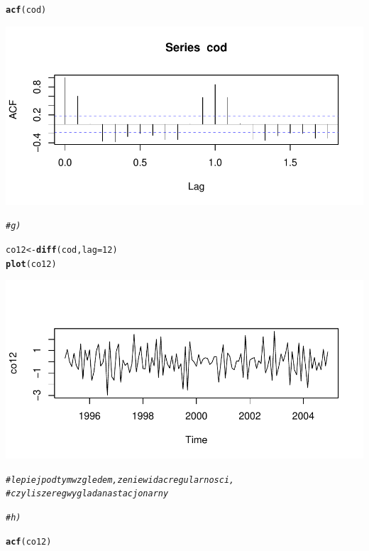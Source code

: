 \documentclass[10pt,a4paper,noindentfirst]{article}\usepackage[]{graphicx}\usepackage[]{color}
\makeatletter
\def\maxwidth{ %
  \ifdim\Gin@nat@width>\linewidth
    \linewidth
  \else
    \Gin@nat@width
  \fi
}
\newcommand{\hlnum}[1]{\textcolor[rgb]{0.686,0.059,0.569}{#1}}%
\newcommand{\hlcom}[1]{\textcolor[rgb]{0.678,0.584,0.686}{\textit{#1}}}%
\newcommand{\hlstd}[1]{\textcolor[rgb]{0.345,0.345,0.345}{#1}}%
\newcommand{\hlkwb}[1]{\textcolor[rgb]{0.69,0.353,0.396}{#1}}%
\newcommand{\hlkwc}[1]{\textcolor[rgb]{0.333,0.667,0.333}{#1}}%
\newcommand{\hlkwd}[1]{\textcolor[rgb]{0.737,0.353,0.396}{\textbf{#1}}}%
\newenvironment{kframe}{%
 \def\at@end@of@kframe{}%
 \ifinner\ifhmode%
  \def\at@end@of@kframe{\end{minipage}}%
  \begin{minipage}{\columnwidth}%
 \fi\fi%
 \def\FrameCommand##1{\hskip\@totalleftmargin \hskip-\fboxsep
 \colorbox{shadecolor}{##1}\hskip-\fboxsep
     \hskip-\linewidth \hskip-\@totalleftmargin \hskip\columnwidth}%
 \MakeFramed {\advance\hsize-\width
   \@totalleftmargin\z@ \linewidth\hsize
   \@setminipage}}%
 {\par\unskip\endMakeFramed%
 \at@end@of@kframe}
\newenvironment{knitrout}{}{} %
\makeatother
\begin{document}
\begin{knitrout}
\begin{kframe}
\begin{alltt}
\hlkwd{acf}\hlstd{(cod)}
\end{alltt}
\end{kframe}

{\centering \includegraphics[width=\maxwidth]{figure/unnamed-chunk-16} 

}


\begin{kframe}\begin{alltt}
\hlcom{# g)}

\hlstd{co12} \hlkwb{<-} \hlkwd{diff}\hlstd{(cod,}\hlkwc{lag}\hlstd{=}\hlnum{12}\hlstd{)}
\hlkwd{plot}\hlstd{(co12)}
\end{alltt}
\end{kframe}

{\centering \includegraphics[width=\maxwidth]{figure/unnamed-chunk-17} 

}


\begin{kframe}\begin{alltt}
\hlcom{# lepiej pod tym wzgledem, ze nie widac regularnosci, }
\hlcom{# czyli szereg wyglada na stacjonarny}

\hlcom{# h)}

\hlkwd{acf}\hlstd{(co12)}
\end{alltt}
\end{kframe}


\end{knitrout}
\end{document}
